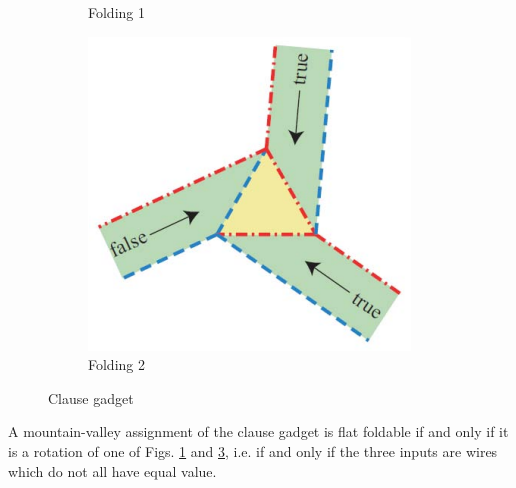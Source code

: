 \begin{figure}[h!tbp]
\begin{subfigure}{.3\textwidth}
    \caption{Folding 1}
    \label{clause-fold-1}
  \end{subfigure}
  \begin{subfigure}{.3\textwidth}
    \includegraphics[width=\textwidth]{origami-data/clause-fold-2}
    \caption{Folding 2}
    \label{clause-fold-2}
  \end{subfigure}
  \caption{Clause gadget \cite{demaine-GFALOP-lecture}}
\end{figure}

\begin{lemma}
  \label{flat-clause}
  A mountain-valley assignment of the clause gadget is flat foldable
  if and only if it is a rotation of one of Figs. \ref{clause-fold-1}
  and \ref{clause-fold-2}, i.e. if and only if the three inputs are
  wires which do not all have equal value.
\end{lemma}

